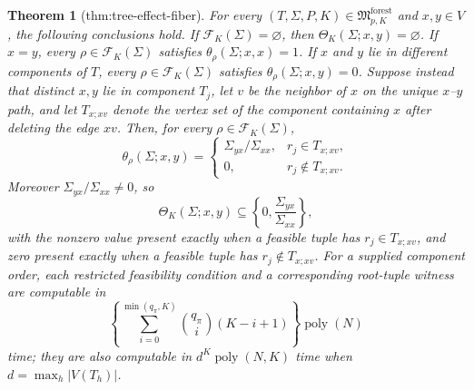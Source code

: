 \documentclass{article}
\newtheorem{theorem}{Theorem}
\begin{document}
\begin{theorem}[thm:tree-effect-fiber]\label{thm:tree-effect-fiber}
For every \((T,\Sigma,P,K)\in\mathfrak M_{p,K}^{\mathrm{forest}}\) and \(x,y\in V\), the following conclusions hold. If \(\mathcal F_K(\Sigma)=\varnothing\), then \(\Theta_K(\Sigma;x,y)=\varnothing\). If \(x=y\), every \(\rho\in\mathcal F_K(\Sigma)\) satisfies \(\theta_\rho(\Sigma;x,x)=1\). If \(x\) and \(y\) lie in different components of \(T\), every \(\rho\in\mathcal F_K(\Sigma)\) satisfies \(\theta_\rho(\Sigma;x,y)=0\). Suppose instead that distinct \(x,y\) lie in component \(T_j\), let \(v\) be the neighbor of \(x\) on the unique \(x\)--\(y\) path, and let \(T_{x;xv}\) denote the vertex set of the component containing \(x\) after deleting the edge \(xv\). Then, for every \(\rho\in\mathcal F_K(\Sigma)\),
\[
 \theta_\rho(\Sigma;x,y)=
 \begin{cases}
 \Sigma_{yx}/\Sigma_{xx},&r_j\in T_{x;xv},\\
 0,&r_j\notin T_{x;xv}.
 \end{cases}
\]
Moreover \(\Sigma_{yx}/\Sigma_{xx}\ne0\), so
\[
 \Theta_K(\Sigma;x,y)\subseteq
 \left\{0,\frac{\Sigma_{yx}}{\Sigma_{xx}}\right\},
\]
with the nonzero value present exactly when a feasible tuple has \(r_j\in T_{x;xv}\), and zero present exactly when a feasible tuple has \(r_j\notin T_{x;xv}\). For a supplied component order, each restricted feasibility condition and a corresponding root-tuple witness are computable in
\[
 \left\{\sum_{i=0}^{\min(q_\pi,K)}
 \binom{q_\pi}{i}(K-i+1)\right\}\operatorname{poly}(N)
\]
time; they are also computable in \(d^K\operatorname{poly}(N,K)\) time when \(d=\max_h|V(T_h)|\).
\end{theorem}
\end{document}
